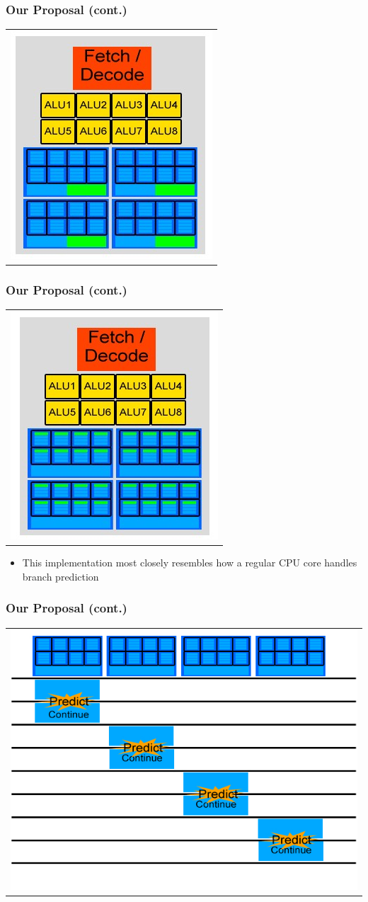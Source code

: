 \documentclass{beamer}
\begin{document}
\begin{frame}
	\frametitle{Our Proposal (cont.)}
	\begin{tabular}{c}
		\includegraphics[width=.5\textwidth]{Our-GPU---per-context-group-predictor.jpg}
	\end{tabular}
\end{frame}

\begin{frame}
	\frametitle{Our Proposal (cont.)}
	\begin{tabular}{c}
		\includegraphics[width=.5\textwidth]{Our-GPU---per-element-predictor.jpg}
	\end{tabular}
	\begin{itemize}
		\item This implementation most closely resembles how a regular CPU core handles branch prediction
	\end{itemize}
\end{frame}

\begin{frame}
	\frametitle{Our Proposal (cont.)}
	\begin{tabular}{c}
		\includegraphics[width=.75\textwidth]{GPU-predict-context.jpg}
	\end{tabular}
\end{frame}
\end{document}
